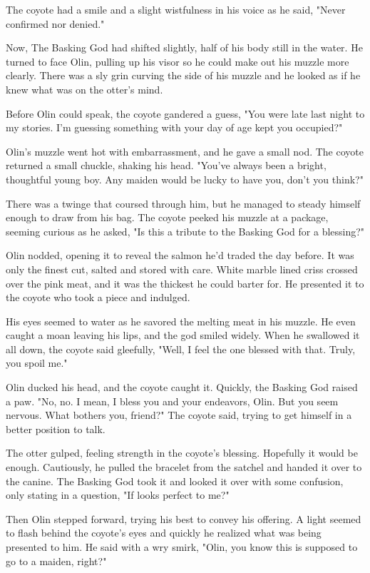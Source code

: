 The coyote had a smile and a slight wistfulness in his voice as he said, "Never confirmed nor denied."

Now, The Basking God had shifted slightly, half of his body still in the water. He turned to face Olin, pulling up his visor so he could make out his muzzle more clearly. There was a sly grin curving the side of his muzzle and he looked as if he knew what was on the otter's mind.

Before Olin could speak, the coyote gandered a guess, "You were late last night to my stories. I'm guessing something with your day of age kept you occupied?"

Olin's muzzle went hot with embarrassment, and he gave a small nod. The coyote returned a small chuckle, shaking his head. "You've always been a bright, thoughtful young boy. Any maiden would be lucky to have you, don't you think?"

There was a twinge that coursed through him, but he managed to steady himself enough to draw from his bag. The coyote peeked his muzzle at a package, seeming curious as he asked, "Is this a tribute to the Basking God for a blessing?"

Olin nodded, opening it to reveal the salmon he'd traded the day before. It was only the finest cut, salted and stored with care. White marble lined criss crossed over the pink meat, and it was the thickest he could barter for. He presented it to the coyote who took a piece and indulged.

His eyes seemed to water as he savored the melting meat in his muzzle. He even caught a moan leaving his lips, and the god smiled widely. When he swallowed it all down, the coyote said gleefully, "Well, I feel the one blessed with that. Truly, you spoil me."

Olin ducked his head, and the coyote caught it. Quickly, the Basking God raised a paw. "No, no. I mean, I bless you and your endeavors, Olin. But you seem nervous. What bothers you, friend?" The coyote said, trying to get himself in a better position to talk.

The otter gulped, feeling strength in the coyote's blessing. Hopefully it would be enough. Cautiously, he pulled the bracelet from the satchel and handed it over to the canine. The Basking God took it and looked it over with some confusion, only stating in a question, "If looks perfect to me?"

Then Olin stepped forward, trying his best to convey his offering. A light seemed to flash behind the coyote's eyes and quickly he realized what was being presented to him. He said with a wry smirk, "Olin, you know this is supposed to go to a maiden, right?"

